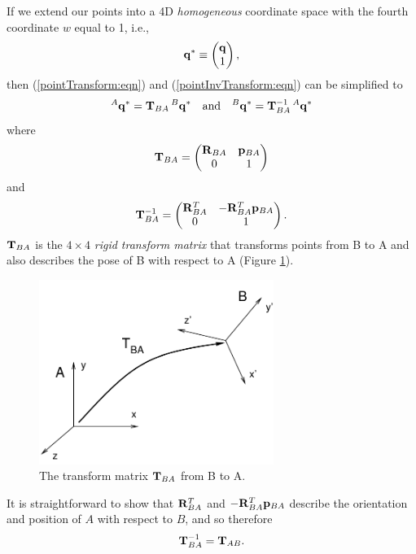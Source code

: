 If we extend our points into a 4D {\it homogeneous} coordinate space
with the fourth coordinate $w$ equal to 1, i.e.,
%
\begin{equation}
{\bf q}^* \equiv \left(\begin{matrix} {\bf q} \\ 1 \end{matrix}\right),
\end{equation}
%
then (\ref{pointTransform:eqn}) and
(\ref{pointInvTransform:eqn}) can be simplified to
%
\begin{equation*}
{}^A{\bf q}^* = {\bf T}_{BA} \, {}^B{\bf q}^* \quad \text{and} \quad
{}^B{\bf q}^* = {\bf T}_{BA}^{-1} \, {}^A{\bf q}^*
\end{equation*}
%
where
%
\begin{equation}
{\bf T}_{BA} = \left(\begin{matrix} {\bf R}_{BA} & {\bf p}_{BA} \\ 0 & 1 \end{matrix}\right)
\end{equation}
%
and
%
\begin{equation}
{\bf T}_{BA}^{-1} = \left(\begin{matrix} {\bf R}_{BA}^T & -{\bf R}_{BA}^T {\bf p}_{BA} \\ 0 & 1 \end{matrix}\right).
\end{equation}
%
${\bf T}_{BA}$ is the $4 \times 4$ {\it rigid transform matrix} that
transforms points from B to A and also describes the pose of
B with respect to A (Figure \ref{transformAB:fig}).

\begin{figure}[t]
\begin{center}
 \includegraphics[width=3in]{images/transformAB}
\end{center}
\caption{The transform matrix ${\bf T}_{BA}$ from B to A.}
\label{transformAB:fig}
\end{figure}

It is straightforward to show that ${\bf R}_{BA}^T$ and $-{\bf R}_{BA}^T
{\bf p}_{BA}$ describe the orientation and position of $A$ with respect to
$B$, and so therefore
%
\begin{equation}
{\bf T}_{BA}^{-1} = {\bf T}_{AB}.
\label{transformInverse:eqn}
\end{equation}
%

